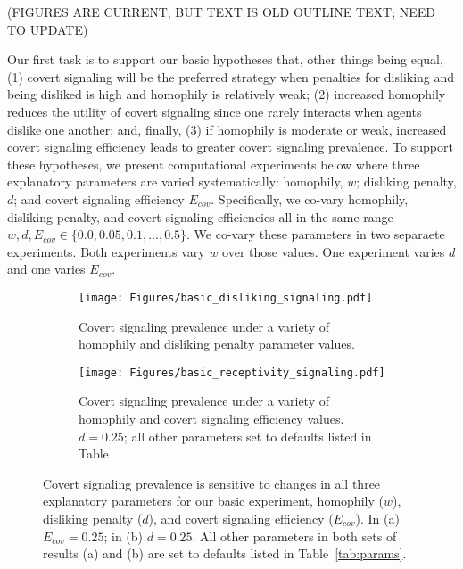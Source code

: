 \documentclass[11pt,letterpaper]{article}
\begin{document}

(FIGURES ARE CURRENT, BUT TEXT IS OLD OUTLINE TEXT; NEED TO UPDATE)

Our first task is to support our basic hypotheses that, other
things being equal, (1) covert signaling will
be the preferred strategy when penalties for disliking and 
being disliked is high and homophily is relatively weak; (2) increased homophily reduces the utility of
covert signaling since one rarely interacts when agents dislike one another;
and, finally, (3) if homophily is moderate or weak, increased covert signaling
efficiency leads to greater covert signaling prevalence.
To support these hypotheses, we present computational experiments below where
three explanatory parameters are varied systematically: homophily, $w$; 
disliking penalty, $d$; and covert signaling efficiency $E_{cov}$. 
Specifically, we co-vary homophily, disliking penalty, and covert signaling
efficiencies all in the same range $w,d,E_{cov} \in \{0.0, 0.05, 0.1, \ldots, 0.5\}$.
We co-vary these parameters in two separaete experiments. Both experiments
vary $w$ over those values. One experiment varies $d$ and one varies $E_{cov}$.

\begin{figure}[H]
  \centering
  \begin{subfigure}{0.49\textwidth}
    \centering
    \texttt{[image: Figures/basic\_disliking\_signaling.pdf]}
    \caption{Covert signaling prevalence under a variety of homophily and
    disliking penalty parameter values. }
  \end{subfigure}
  \begin{subfigure}{0.49\textwidth}
    \centering
    \texttt{[image: Figures/basic\_receptivity\_signaling.pdf]}
    \caption{Covert signaling prevalence under a variety of homophily and
    covert signaling efficiency values. $d=0.25$; all other parameters set to
  defaults listed in Table~}
  \end{subfigure}
  
  \caption{Covert signaling prevalence is sensitive to changes in all 
  three explanatory parameters for our basic experiment, homophily ($w$),
disliking penalty ($d$), and covert signaling efficiency ($E_{cov}$). 
In (a) $E_{cov}=0.25$; in (b) $d=0.25$. All other parameters in both sets of 
    results (a) and (b) are set to defaults listed in Table~\ref{tab:params}.}
  \label{fig:dislikingHomophilyHeatmap}
\end{figure}
\end{document}
